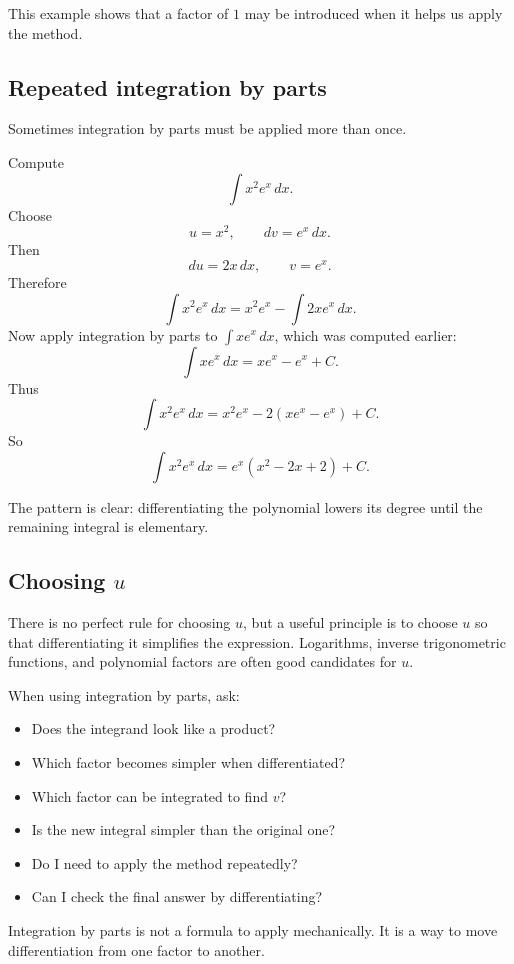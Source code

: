 This example shows that a factor of \(1\) may be introduced when it helps us apply the method.

\subsection*{Repeated integration by parts}

Sometimes integration by parts must be applied more than once.

\begin{examplebox}
Compute
\[
\int x^2 e^x\,dx.
\]
Choose
\[
u=x^2,
\qquad
dv=e^x\,dx.
\]
Then
\[
du=2x\,dx,
\qquad
v=e^x.
\]
Therefore
\[
\int x^2e^x\,dx=x^2e^x-\int 2xe^x\,dx.
\]
Now apply integration by parts to \(\int xe^x\,dx\), which was computed earlier:
\[
\int xe^x\,dx=xe^x-e^x+C.
\]
Thus
\[
\int x^2e^x\,dx=x^2e^x-2(xe^x-e^x)+C.
\]
So
\[
\int x^2e^x\,dx=e^x(x^2-2x+2)+C.
\]
\end{examplebox}

The pattern is clear: differentiating the polynomial lowers its degree until the remaining integral is elementary.

\subsection*{Choosing \(u\)}

There is no perfect rule for choosing \(u\), but a useful principle is to choose \(u\) so that differentiating it simplifies the expression. Logarithms, inverse trigonometric functions, and polynomial factors are often good candidates for \(u\).

\begin{summarybox}
When using integration by parts, ask:
\begin{itemize}
\item Does the integrand look like a product?
\item Which factor becomes simpler when differentiated?
\item Which factor can be integrated to find \(v\)?
\item Is the new integral simpler than the original one?
\item Do I need to apply the method repeatedly?
\item Can I check the final answer by differentiating?
\end{itemize}
\end{summarybox}

Integration by parts is not a formula to apply mechanically. It is a way to move differentiation from one factor to another.